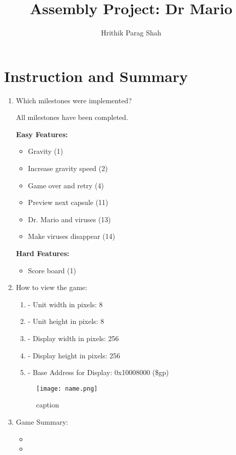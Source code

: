 \documentclass{article}
\title{Assembly Project: Dr Mario}
\author{Hrithik Parag Shah}
\begin{document}
\maketitle

\section{Instruction and Summary}

\begin{enumerate}

    \item Which milestones were implemented? 

        All milestones have been completed.

        \textbf{Easy Features:}
        \begin{itemize}
            \item Gravity (1)
            \item Increase gravity speed (2)
            \item Game over and retry (4)
            \item Preview next capsule (11)
            \item Dr. Mario and viruses (13)
            \item Make viruses disappear (14)
        \end{itemize}

        \textbf{Hard Features:}
        \begin{itemize}
            \item Score board (1)
        \end{itemize}

    \item How to view the game:
    
    \begin{enumerate}

    \item - Unit width in pixels: 8
    \item - Unit height in pixels: 8
    \item - Display width in pixels: 256
    \item - Display height in pixels: 256
    \item - Base Address for Display: 0x10008000 (\$gp)

    \end{enumerate}

    

\begin{figure}[ht!]
    \centering
    \texttt{[image: name.png]}
    \caption{caption}
    \label{Instructions}
\end{figure}

\item Game Summary:
\begin{itemize}
\item
\item
\end{itemize}

    
\end{enumerate}
\end{document}
